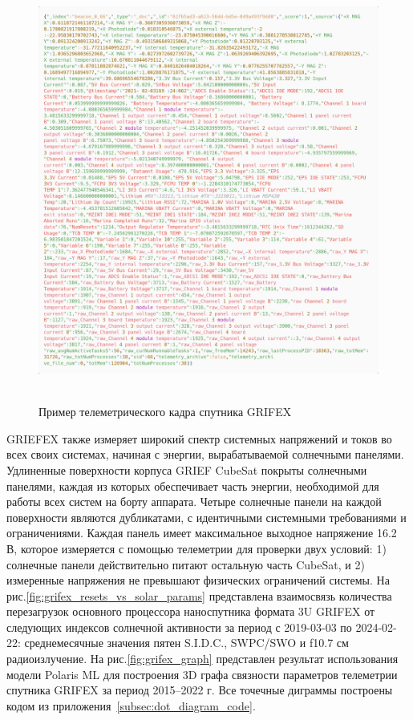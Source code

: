 \documentclass[14pt, a4paper]{../cls/coursework}
\begin{document}
    \begin{figure}[htbp]
        \centering
        \includegraphics[width=1\linewidth]{grifex_telemetry_sample}
        ~\caption{Пример телеметрического кадра спутника GRIFEX}
        \label{fig:grifex_telemetry_sample}
    \end{figure}

    GRIEFEX также измеряет широкий спектр системных напряжений и токов во всех своих системах, начиная с энергии, вырабатываемой солнечными панелями. Удлиненные поверхности корпуса GRIEF CubeSat покрыты солнечными панелями, каждая из которых обеспечивает часть энергии, необходимой для работы всех систем на борту аппарата. Четыре солнечные панели на каждой поверхности являются дубликатами, с идентичными системными требованиями и ограничениями. Каждая панель имеет максимальное выходное напряжение 16.2 В, которое измеряется с помощью телеметрии для проверки двух условий: 1) солнечные панели действительно питают остальную часть CubeSat, и 2) измеренные напряжения не превышают физических ограничений системы.
    На рис.\ref{fig:grifex_resets_vs_solar_params} представлена взаимосвязь количества перезагрузок основного процессора наноспутника формата 3U GRIFEX от следующих индексов солнечной активности за период с 2019-03-03 по 2024-02-22: среднемесячные значения пятен S.I.D.C., SWPC/SWO и f10.7 см радиоизлучение.
    На рис.\ref{fig:grifex_graph} представлен результат использования модели Polaris ML для построения 3D графа связности параметров телеметрии спутника GRIFEX за период 2015–2022 г.
    Все точечные диграммы построены кодом из приложения~\ref{subsec:dot_diagram_code}.
\end{document}
